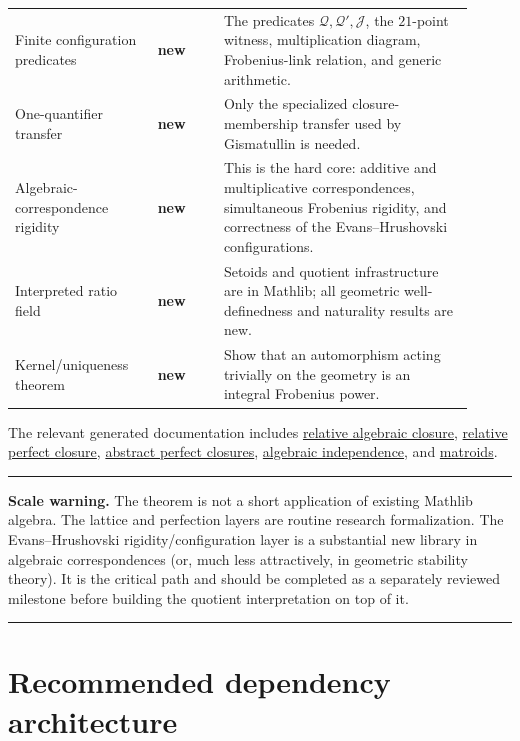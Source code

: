 \documentclass[11pt,oneside]{article}
\theoremstyle{definition}
\theoremstyle{remark}
\newcommand{\Qrel}{\mathcal{Q}}
\newcommand{\Qprel}{\mathcal{Q}'}
\newcommand{\Jrel}{\mathcal{J}}
\newcommand{\statusnew}{\textcolor{brick}{\textbf{new}}}
\newenvironment{riskbox}
  {\par\medskip\begin{center}\begin{minipage}{0.94\linewidth}\color{brick}\hrule\medskip\color{black}}
  {\medskip\color{brick}\hrule\end{minipage}\end{center}\par\medskip}
\begin{document}
\begin{longtable}{>{\raggedright\arraybackslash}p{0.29\linewidth}
                  >{\raggedright\arraybackslash}p{0.13\linewidth}
                  >{\raggedright\arraybackslash}p{0.49\linewidth}}
Finite configuration predicates & \statusnew &
The predicates $\Qrel,\Qprel,\Jrel$, the $21$-point witness, multiplication diagram,
Frobenius-link relation, and generic arithmetic.\\
One-quantifier transfer & \statusnew &
Only the specialized closure-membership transfer used by Gismatullin is needed.\\
Algebraic-correspondence rigidity & \statusnew &
This is the hard core: additive and multiplicative correspondences, simultaneous
Frobenius rigidity, and correctness of the Evans--Hrushovski configurations.\\
Interpreted ratio field & \statusnew &
Setoids and quotient infrastructure are in Mathlib; all geometric well-definedness and
naturality results are new.\\
Kernel/uniqueness theorem & \statusnew &
Show that an automorphism acting trivially on the geometry is an integral Frobenius
power.\\
\bottomrule
\end{longtable}

The relevant generated documentation includes
\href{https://leanprover-community.github.io/mathlib4_docs/Mathlib/FieldTheory/AlgebraicClosure.html}{relative algebraic closure},
\href{https://leanprover-community.github.io/mathlib4_docs/Mathlib/FieldTheory/PurelyInseparable/PerfectClosure.html}{relative perfect closure},
\href{https://leanprover-community.github.io/mathlib4_docs/Mathlib/FieldTheory/IsPerfectClosure.html}{abstract perfect closures},
\href{https://leanprover-community.github.io/mathlib4_docs/Mathlib/RingTheory/AlgebraicIndependent/Basic.html}{algebraic independence}, and
\href{https://leanprover-community.github.io/mathlib4_docs/Mathlib/Combinatorics/Matroid/Basic.html}{matroids}.

\begin{riskbox}
\textbf{Scale warning.}  The theorem is not a short application of existing Mathlib
algebra.  The lattice and perfection layers are routine research formalization.  The
Evans--Hrushovski rigidity/configuration layer is a substantial new library in algebraic
correspondences (or, much less attractively, in geometric stability theory).  It is the
critical path and should be completed as a separately reviewed milestone before building
the quotient interpretation on top of it.
\end{riskbox}

\section{Recommended dependency architecture}
\end{document}

